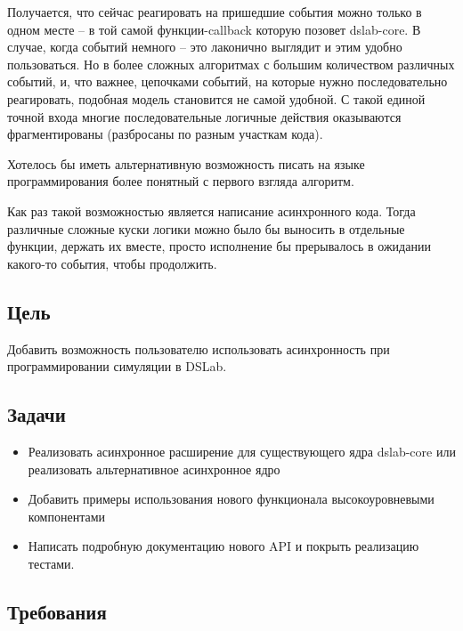 Получается, что сейчас реагировать на пришедшие события можно только в одном месте -- в той самой функции-callback которую позовет dslab-core. В случае, когда событий немного -- это лаконично выглядит и этим удобно пользоваться. Но в более сложных алгоритмах с большим количеством различных событий, и, что важнее, цепочками событий, на которые нужно последовательно реагировать, подобная модель становится не самой удобной. С такой единой точной входа многие последовательные логичные действия оказываются фрагментированы (разбросаны по разным участкам кода). 

Хотелось бы иметь альтернативную возможность писать на языке программирования более понятный с первого взгляда алгоритм.

Как раз такой возможностью является написание асинхронного кода. Тогда различные сложные куски логики можно было бы выносить в отдельные функции, держать их вместе, просто исполнение бы прерывалось в ожидании какого-то события, чтобы продолжить.

\subsection{Цель}

Добавить возможность пользователю использовать асинхронность при программировании симуляции в DSLab.

\subsection{Задачи}
\begin{itemize}
    \item Реализовать асинхронное расширение для существующего ядра dslab-core или реализовать альтернативное асинхронное ядро 
    \item Добавить примеры использования нового функционала высокоуровневыми компонентами
    \item Написать подробную документацию нового API и покрыть реализацию тестами.
\end{itemize}

\subsection{Требования}

